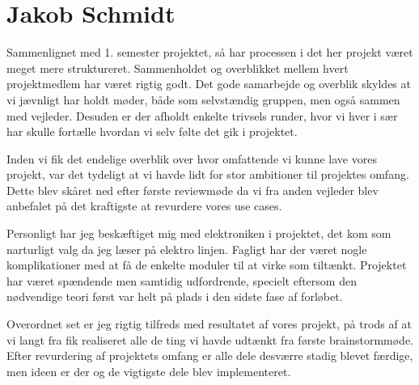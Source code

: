 \section{Jakob Schmidt}
Sammenlignet med 1. semester projektet, så har processen i det her projekt været meget mere struktureret. Sammenholdet og overblikket mellem hvert projektmedlem har været rigtig godt. Det gode samarbejde og overblik skyldes at vi jævnligt har holdt møder, både som selvstændig gruppen, men også sammen med vejleder. Desuden er der afholdt enkelte trivsels runder, hvor vi hver i sær har skulle fortælle hvordan vi selv følte det gik i projektet. 

Inden vi fik det endelige overblik over hvor omfattende vi kunne lave vores projekt, var det tydeligt at vi havde lidt for stor ambitioner til projektes omfang. Dette blev skåret ned efter første reviewmøde da vi fra anden vejleder blev anbefalet på det kraftigste at revurdere vores use cases.

Personligt har jeg beskæftiget mig med elektroniken i projektet, det kom som narturligt valg da jeg læser på elektro linjen. Fagligt har der været nogle komplikationer med at få de enkelte moduler til at virke som tiltænkt. Projektet har været spændende men samtidig udfordrende, specielt eftersom den nødvendige teori først var helt på plads i den sidste fase af forløbet.  

Overordnet set er jeg rigtig tilfreds med resultatet af vores projekt, på trods af at vi langt fra fik realiseret alle de ting vi havde udtænkt fra første brainstormmøde. Efter revurdering af projektets omfang er alle dele desværre stadig blevet færdige, men ideen er der og de vigtigste dele blev implementeret. 